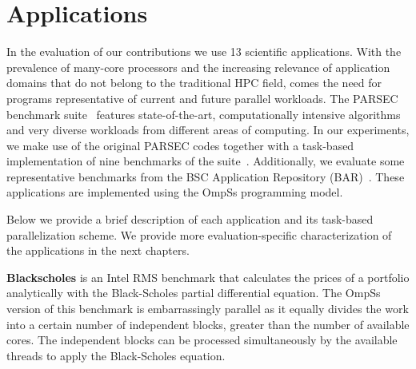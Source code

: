 \section{Applications}
\label{sec.background.applications}

In the evaluation of our contributions we use 13 scientific applications. 
With the prevalence of many-core processors and the increasing relevance of application 
domains that do not belong to the traditional HPC field, comes the need for programs 
representative of current and future parallel workloads. 
The PARSEC benchmark suite~\cite{PARSEC3,Bienia:PhD2011} features state-of-the-art, 
computationally intensive algorithms and very diverse workloads from different areas of computing.
In our experiments, we make use of the original PARSEC codes together with a task-based implementation of nine benchmarks of the suite~\cite{Chasapis:TACO2016}. 
Additionally, we evaluate some representative benchmarks from the BSC Application Repository (BAR)~\cite{BAR}.
These applications are implemented using the OmpSs programming model.

Below we provide a brief description of each application and its task-based parallelization scheme. 
We provide more evaluation-specific characterization of the applications in the next chapters.














\textbf{Blackscholes} is an Intel RMS benchmark that calculates the prices of a portfolio analytically with the Black-Scholes partial differential equation. 
The OmpSs version of this benchmark is embarrassingly parallel as it equally divides the work into a certain number of independent blocks, greater than the number of available cores. 
The independent blocks can be processed simultaneously by the available threads to apply the Black-Scholes equation.

